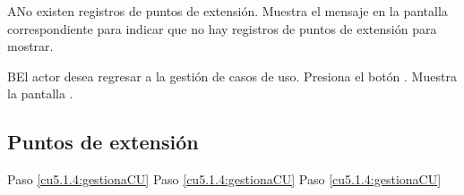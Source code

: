  \begin{UCtrayectoriaA}{A}{No existen registros de puntos de extensión.}
    \UCpaso[\UCsist] Muestra el mensaje  en la pantalla correspondiente
    para indicar que no hay registros de puntos de extensión para mostrar.
 \end{UCtrayectoriaA}
 
 \begin{UCtrayectoriaA}{B}{El actor desea regresar a la gestión de casos de uso.}
    \UCpaso[\UCactor] Presiona el botón .
    \UCpaso[\UCsist] Muestra la pantalla .
 \end{UCtrayectoriaA}

\subsection{Puntos de extensión}

	{Paso \ref{cu5.1.4:gestionaCU}}
	{}
	{Paso \ref{cu5.1.4:gestionaCU}}
	{}
	{Paso \ref{cu5.1.4:gestionaCU}}
	{}
  